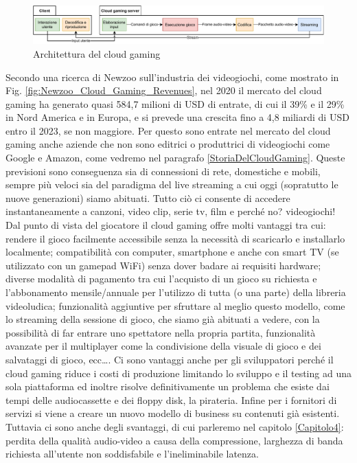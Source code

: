 \begin{figure}[H]
	\includegraphics[width=\linewidth]{immagini/cloud_gaming_general_scheme}
	\caption{Architettura del cloud gaming}
	\label{fig:cloud_gaming_general_scheme}
\end{figure}

Secondo una ricerca di Newzoo\cite{Global_Cloud_Gaming_Report} sull'industria dei videogiochi, come mostrato in Fig. \ref{fig:Newzoo_Cloud_Gaming_Revenues}, nel 2020 il mercato del cloud gaming ha generato quasi 584,7 milioni di USD di entrate, di cui il 39\% e il 29\% in Nord America e in Europa, e si prevede una crescita fino a 4,8 miliardi di USD entro il 2023, se non maggiore. Per questo sono entrate nel mercato del cloud gaming anche aziende che non sono editrici o produttrici di videogiochi come Google e Amazon, come vedremo nel paragrafo \ref{StoriaDelCloudGaming}. Queste previsioni sono conseguenza sia di connessioni di rete, domestiche e mobili, sempre più veloci sia del paradigma del live streaming a cui oggi (sopratutto le nuove generazioni) siamo abituati. Tutto ciò ci consente di accedere instantaneamente a canzoni, video clip, serie tv, film e perché no? videogiochi! Dal punto di vista del giocatore il cloud gaming offre molti vantaggi tra cui: rendere il gioco facilmente accessibile senza la necessità di scaricarlo e installarlo localmente; compatibilità con computer, smartphone e anche con smart TV (se utilizzato con un gamepad WiFi) senza dover badare ai requisiti hardware; diverse modalità di pagamento tra cui l'acquisto di un gioco su richiesta e l'abbonamento mensile/annuale per l'utilizzo di tutta (o una parte) della libreria videoludica; funzionalità aggiuntive per sfruttare al meglio questo modello, come lo streaming della sessione di gioco, che siamo già abituati a vedere, con la possibilità di far entrare uno spettatore nella propria partita, funzionalità avanzate per il multiplayer come la condivisione della visuale di gioco e dei salvataggi di gioco, ecc\dots. Ci sono vantaggi anche per gli sviluppatori perché il cloud gaming riduce i costi di produzione limitando lo sviluppo e il testing ad una sola piattaforma ed inoltre risolve definitivamente un problema che esiste dai tempi delle audiocassette e dei floppy disk, la pirateria. Infine per i fornitori di servizi si viene a creare un nuovo modello di business su contenuti già esistenti. Tuttavia ci sono anche degli svantaggi, di cui parleremo nel capitolo \ref{Capitolo4}: perdita della qualità audio-video a causa della compressione, larghezza di banda richiesta all'utente non soddisfabile e l'ineliminabile latenza.

